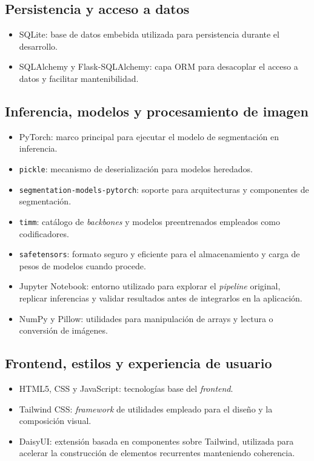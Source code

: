 \subsection{Persistencia y acceso a datos}

\begin{itemize}
	\item SQLite: base de datos embebida utilizada para persistencia durante el desarrollo.
	\item SQLAlchemy y Flask-SQLAlchemy: capa ORM para desacoplar el acceso a datos y facilitar mantenibilidad.
\end{itemize}

\subsection{Inferencia, modelos y procesamiento de imagen}

\begin{itemize}
	\item PyTorch: marco principal para ejecutar el modelo de segmentación en inferencia.
	\item \texttt{pickle}: mecanismo de deserialización para modelos heredados.
	\item \texttt{segmentation-models-pytorch}: soporte para arquitecturas y componentes de segmentación.
	\item \texttt{timm}: catálogo de \textit{backbones} y modelos preentrenados empleados como codificadores.
	\item \texttt{safetensors}: formato seguro y eficiente para el almacenamiento y carga de pesos de modelos cuando procede.
	\item Jupyter Notebook: entorno utilizado para explorar el \textit{pipeline} original, replicar inferencias y validar resultados antes de integrarlos en la aplicación.
	\item NumPy y Pillow: utilidades para manipulación de arrays y lectura o conversión de imágenes.
\end{itemize}

\subsection{Frontend, estilos y experiencia de usuario}

\begin{itemize}
	\item HTML5, CSS y JavaScript: tecnologías base del \textit{frontend}.
	\item Tailwind CSS: \textit{framework} de utilidades empleado para el diseño y la composición visual.
	\item DaisyUI: extensión basada en componentes sobre Tailwind, utilizada para acelerar la construcción de elementos recurrentes manteniendo coherencia.
\end{itemize}

